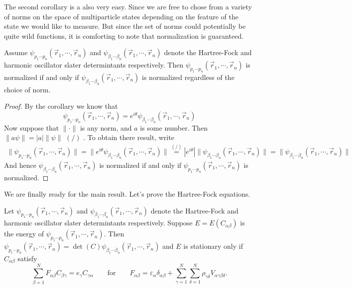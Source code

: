 \documentclass[11pt,english,a4paper]{article}
\begin{document}
The second corollary is a also very easy. Since we are free to chose from a variety of norms on the space of multiparticle states depending on the feature of the state we would like to measure. But since the set of norms could potentially be quite wild functions, it is comforting to note that normalization is guaranteed.
\begin{corollary}
Assume $\psi_{  p_1\cdots p_n}(\vec{r}_1,\cdots, \vec{r}_n)$ and $\psi_{  \beta_1\cdots \beta_n}(\vec{r}_1,\cdots, \vec{r}_n)$ denote the Hartree-Fock and harmonic oscillator slater determintants respectively. Then $\psi_{  p_1\cdots p_n}(\vec{r}_1,\cdots, \vec{r}_n)$ is normalized if and only if $\psi_{  \beta_1\cdots \beta_n}(\vec{r}_1,\cdots, \vec{r}_n)$ is normalized regardless of the choice of norm.
\end{corollary}
\begin{proof}
By the corollary we know that
\[
\psi_{  p_1\cdots p_n}(\vec{r}_1,\cdots, \vec{r}_n) = e^{ i \theta}\psi_{  \beta_1\cdots \beta_n}(\vec{r}_1,\cdots, \vec{r}_n) 
\]
Now suppose that $\|\cdot \|$ is any norm, and $a$ is some number. Then $\|a \psi \| = |a| \| \psi \|$ $(/)$ \parencite[124]{lindstrom_mathematical_2016}. To obtain there result, write
\begin{align*}
\|\psi_{  p_1\cdots p_n}(\vec{r}_1,\cdots, \vec{r}_n) \| = \|e^{ i \theta}\psi_{  \beta_1\cdots \beta_n}(\vec{r}_1,\cdots, \vec{r}_n)\| \stackrel{(/)}{=} |e^{ i \theta}|\|\psi_{  \beta_1\cdots \beta_n}(\vec{r}_1,\cdots, \vec{r}_n)\| = \|\psi_{  \beta_1\cdots \beta_n}(\vec{r}_1,\cdots, \vec{r}_n)\|
\end{align*}
And hence $\psi_{  \beta_1\cdots \beta_n}(\vec{r}_1,\cdots, \vec{r}_n)$ is normalized if and only if $\psi_{  p_1\cdots p_n}(\vec{r}_1,\cdots, \vec{r}_n)$ is normalized.
\end{proof}
We are finally ready for the main result. Let's prove the Hartree-Fock equations.
\begin{theorem}
Let $\psi_{  p_1\cdots p_n}(\vec{r}_1,\cdots, \vec{r}_n)$ and $\psi_{  \beta_1\cdots \beta_n}(\vec{r}_1,\cdots, \vec{r}_n)$ denote the Hartree-Fock and harmonic oscillator slater determintants respectively. Suppose $E = E(C_{  \alpha \beta})$ is the energy of $\psi_{  p_1\cdots p_n}(\vec{r}_1,\cdots, \vec{r}_n)$. Then $\psi_{  p_1\cdots p_n}(\vec{r}_1,\cdots, \vec{r}_n) = \det (C) \psi_{  \beta_1\cdots \beta_n}(\vec{r}_1,\cdots, \vec{r}_n)$ and $E$ is stationary only if $C_{  \alpha \beta}$ satisfy
\begin{equation}
\sum_{  \beta = 1}^N F_{  \alpha \beta} C_{  \beta \gamma} = e_\gamma C_{  \gamma \alpha} \qquad \text{for} \qquad F_{  \alpha \beta} = \varepsilon_{  \alpha} \delta_{  \alpha \beta} + \sum_{  \gamma = 1}^N \sum_{  \delta = 1}^N  \rho_{ \gamma \delta}V_{  \alpha \gamma \beta \delta}. \label{eq:hfeq}
\end{equation}
\end{theorem}
\end{document}
